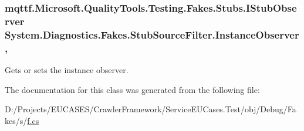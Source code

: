 \hypertarget{class_system_1_1_diagnostics_1_1_fakes_1_1_stub_source_filter_a0540f5280e0cf50dce2f2410e569bf7d}{
\subsubsection[{Instance\-Observer}]{\setlength{\rightskip}{0pt plus 5cm}mqttf.\-Microsoft.\-Quality\-Tools.\-Testing.\-Fakes.\-Stubs.\-I\-Stub\-Observer System.\-Diagnostics.\-Fakes.\-Stub\-Source\-Filter.\-Instance\-Observer\hspace{0.3cm}{\ttfamily [get]}, {\ttfamily [set]}}}\label{class_system_1_1_diagnostics_1_1_fakes_1_1_stub_source_filter_a0540f5280e0cf50dce2f2410e569bf7d}


Gets or sets the instance observer.



The documentation for this class was generated from the following file\-:\begin{DoxyCompactItemize}
\item 
D\-:/\-Projects/\-E\-U\-C\-A\-S\-E\-S/\-Crawler\-Framework/\-Service\-E\-U\-Cases.\-Test/obj/\-Debug/\-Fakes/s/\hyperlink{s_2f_8cs}{f.\-cs}\end{DoxyCompactItemize}
